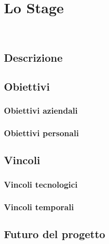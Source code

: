 
\chapter{Lo Stage}
\label{cap:lo-stage}

\\

\section{Descrizione}


\section{Obiettivi}
\subsection{Obiettivi aziendali}
\subsection{Obiettivi personali}

\section{Vincoli}
\subsection{Vincoli tecnologici}
\subsection{Vincoli temporali}

\section{Futuro del progetto}
